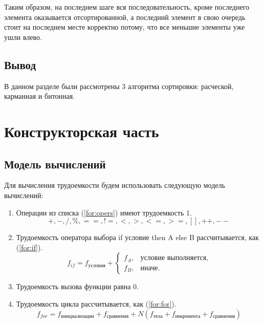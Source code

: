 \documentclass[12pt]{report}
\begin{document}
	Таким образом, на последнем шаге вся последовательность, кроме последнего элемента оказывается отсортированной, а последний элемент в свою очередь стоит на последнем месте корректно потому, что все меньшие элементы уже ушли влево.
	
	\section{Вывод}
	
	В данном разделе были рассмотрены 3 алгоритма сортировки: расческой, карманная и битонная.
	
	\clearpage
	
	\chapter{Конструкторская часть}
	
	\section{Модель вычислений}

	Для вычисления трудоемкости будем использовать следующую модель вычислений:

	\begin{enumerate}
		\item Операции из списка (\ref{for:opers}) имеют трудоемкость 1.
		\begin{equation}
		\label{for:opers}
		+, -, /, \%, ==, !=, <, >, <=, >=, [], ++, {-}-
		\end{equation}
		\item Трудоемкость оператора выбора if условие then A else B рассчитывается, как (\ref{for:if}).
		\begin{equation}
		\label{for:if}
		f_{if} = f_{\text{условия}} +
		\begin{cases}
		f_A, & \text{условие выполняется,}\\
		f_B, & \text{иначе.}
		\end{cases}
		\end{equation}
		\item Трудоемкость вызова функции равна 0.
		\item Трудоемкость цикла рассчитывается, как (\ref{for:for}).
		\begin{equation}
		\label{for:for}
		f_{for} = f_{\text{инициализации}} + f_{\text{сравнения}} + N(f_{\text{тела}} + f_{\text{инкремента}} + f_{\text{сравнения}})
		\end{equation}
	\end{enumerate}
	
\end{document}
